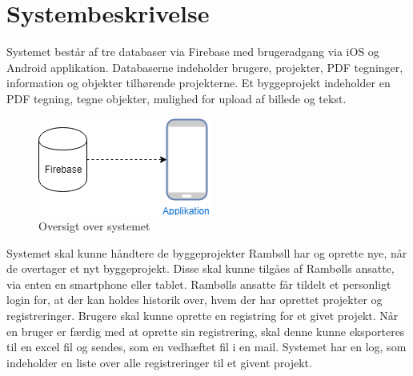 \chapter{Systembeskrivelse}\label{sec:Systembeskrivelse}
	Systemet består af tre databaser via Firebase med brugeradgang via iOS og Android applikation.
	Databaserne indeholder brugere, projekter, PDF tegninger, information og objekter tilhørende projekterne.
	Et byggeprojekt indeholder en PDF tegning, tegne objekter, mulighed for upload af billede og tekst. \\
	
	\begin{figure}[H]
		\centering
		\includegraphics[width=0.4\linewidth]{Systembeskrivelse/Oversigtoversystem}
		\caption{Oversigt over systemet}
		\label{fig:OversigtSystembeskrivelse}
	\end{figure}
	
	Systemet skal kunne håndtere de byggeprojekter Rambøll har og oprette nye, når de overtager et nyt byggeprojekt.
	Disse skal kunne tilgåes af Rambølls ansatte, via enten en smartphone eller tablet.
	Rambølls ansatte får tildelt et personligt login for, at der kan holdes historik over, hvem der har oprettet projekter og registreringer.
	Brugere skal kunne oprette en registring for et givet projekt.
	Når en bruger er færdig med at oprette sin registrering, skal denne kunne eksporteres til en excel fil og sendes, som en vedhæftet fil i en mail.
	Systemet har en log, som indeholder en liste over alle registreringer til et givent projekt. \\	
				 
	\clearpage